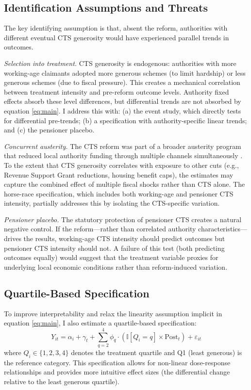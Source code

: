 \documentclass[12pt]{article}
\newcommand{\ind}{\mathbb{I}}
\begin{document}
\subsection{Identification Assumptions and Threats}

The key identifying assumption is that, absent the reform, authorities with different eventual CTS generosity would have experienced parallel trends in outcomes.

\textit{Selection into treatment.} CTS generosity is endogenous: authorities with more working-age claimants adopted more generous schemes (to limit hardship) or less generous schemes (due to fiscal pressure). This creates a mechanical correlation between treatment intensity and pre-reform outcome levels. Authority fixed effects absorb these level differences, but differential trends are not absorbed by equation \ref{eq:main}. I address this with: (a) the event study, which directly tests for differential pre-trends; (b) a specification with authority-specific linear trends; and (c) the pensioner placebo.

\textit{Concurrent austerity.} The CTS reform was part of a broader austerity program that reduced local authority funding through multiple channels simultaneously \citep{fetzer2019}. To the extent that CTS generosity correlates with exposure to other cuts (e.g., Revenue Support Grant reductions, housing benefit caps), the estimates may capture the combined effect of multiple fiscal shocks rather than CTS alone. The horse-race specification, which includes both working-age and pensioner CTS intensity, partially addresses this by isolating the CTS-specific variation.

\textit{Pensioner placebo.} The statutory protection of pensioner CTS creates a natural negative control. If the reform---rather than correlated authority characteristics---drives the results, working-age CTS intensity should predict outcomes but pensioner CTS intensity should not. A failure of this test (both predicting outcomes equally) would suggest that the treatment variable proxies for underlying local economic conditions rather than reform-induced variation.

\subsection{Quartile-Based Specification}

To improve interpretability and relax the linearity assumption implicit in equation \ref{eq:main}, I also estimate a quartile-based specification:
\begin{equation}\label{eq:quartile}
Y_{it} = \alpha_i + \gamma_t + \sum_{q=2}^{4} \phi_q \cdot (\ind[Q_i = q] \times \text{Post}_t) + \varepsilon_{it}
\end{equation}
where $Q_i \in \{1, 2, 3, 4\}$ denotes the treatment quartile and Q1 (least generous) is the reference category. This specification allows for non-linear dose-response relationships and provides more intuitive effect sizes (the differential change relative to the least generous quartile).
\end{document}
